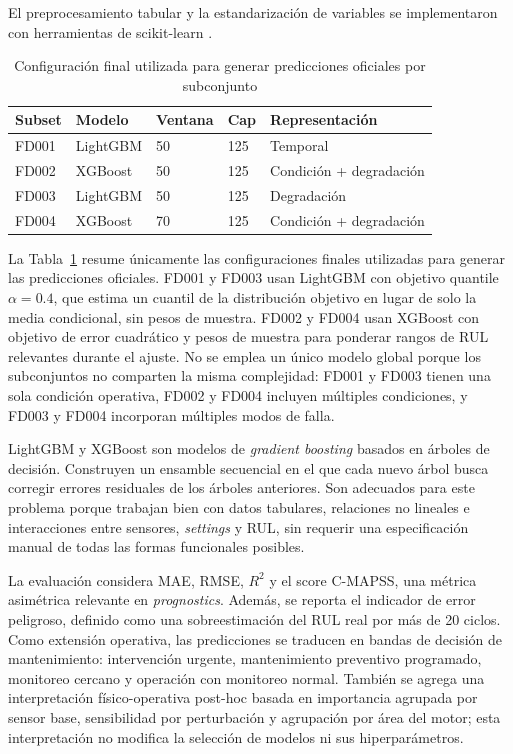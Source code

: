 \documentclass[conference, a4paper]{IEEEtran}
\begin{document}
El preprocesamiento tabular y la estandarización de variables se implementaron con herramientas de scikit-learn \cite{pedregosa2011scikit}.

\begin{table}[!h]
\caption{Configuración final utilizada para generar predicciones oficiales por subconjunto}
\label{tab:final_model_config}
\centering
\footnotesize
\begin{tabular}{lllll}
\hline
Subset & Modelo & Ventana & Cap & Representación \\
\hline
FD001 & LightGBM & 50 & 125 & Temporal \\
FD002 & XGBoost & 50 & 125 & Condición + degradación \\
FD003 & LightGBM & 50 & 125 & Degradación \\
FD004 & XGBoost & 70 & 125 & Condición + degradación \\
\hline
\end{tabular}
\end{table}

La Tabla~\ref{tab:final_model_config} resume únicamente las configuraciones finales utilizadas para generar las predicciones oficiales. FD001 y FD003 usan LightGBM con objetivo quantile $\alpha=0.4$, que estima un cuantil de la distribución objetivo en lugar de solo la media condicional, sin pesos de muestra. FD002 y FD004 usan XGBoost con objetivo de error cuadrático y pesos de muestra para ponderar rangos de RUL relevantes durante el ajuste. No se emplea un único modelo global porque los subconjuntos no comparten la misma complejidad: FD001 y FD003 tienen una sola condición operativa, FD002 y FD004 incluyen múltiples condiciones, y FD003 y FD004 incorporan múltiples modos de falla.

LightGBM y XGBoost son modelos de \textit{gradient boosting} basados en árboles de decisión. Construyen un ensamble secuencial en el que cada nuevo árbol busca corregir errores residuales de los árboles anteriores. Son adecuados para este problema porque trabajan bien con datos tabulares, relaciones no lineales e interacciones entre sensores, \textit{settings} y RUL, sin requerir una especificación manual de todas las formas funcionales posibles.

La evaluación considera MAE, RMSE, $R^2$ y el score C-MAPSS, una métrica asimétrica relevante en \textit{prognostics}. Además, se reporta el indicador de error peligroso, definido como una sobreestimación del RUL real por más de 20 ciclos. Como extensión operativa, las predicciones se traducen en bandas de decisión de mantenimiento: intervención urgente, mantenimiento preventivo programado, monitoreo cercano y operación con monitoreo normal. También se agrega una interpretación físico-operativa post-hoc basada en importancia agrupada por sensor base, sensibilidad por perturbación y agrupación por área del motor; esta interpretación no modifica la selección de modelos ni sus hiperparámetros.
\end{document}
